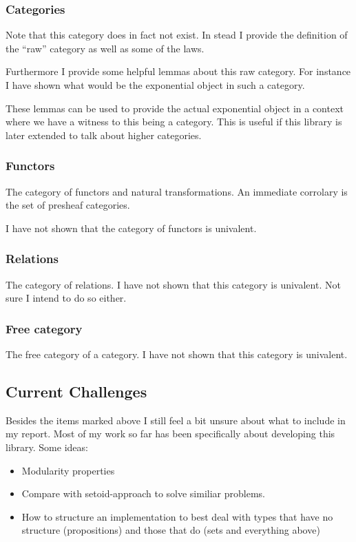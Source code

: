 \subsubsection{Categories}
Note that this category does in fact not exist. In stead I provide the
definition of the ``raw'' category as well as some of the laws.

Furthermore I provide some helpful lemmas about this raw category. For instance
I have shown what would be the exponential object in such a category.

These lemmas can be used to provide the actual exponential object in a context
where we have a witness to this being a category. This is useful if this library
is later extended to talk about higher categories.

\subsubsection{Functors}
The category of functors and natural transformations. An immediate corrolary is
the set of presheaf categories.

\WIP{} I have not shown that the category of functors is univalent.

\subsubsection{Relations}
The category of relations. \WIP{} I have not shown that this category is
univalent. Not sure I intend to do so either.

\subsubsection{Free category}
The free category of a category. \WIP{} I have not shown that this category is
univalent.

\subsection{Current Challenges}
Besides the items marked \WIP{} above I still feel a bit unsure about what to
include in my report. Most of my work so far has been specifically about
developing this library. Some ideas:
%
\begin{itemize}
\item
  Modularity properties
\item
  Compare with setoid-approach to solve similiar problems.
\item
  How to structure an implementation to best deal with types that have no
  structure (propositions) and those that do (sets and everything above)
\end{itemize}
%
